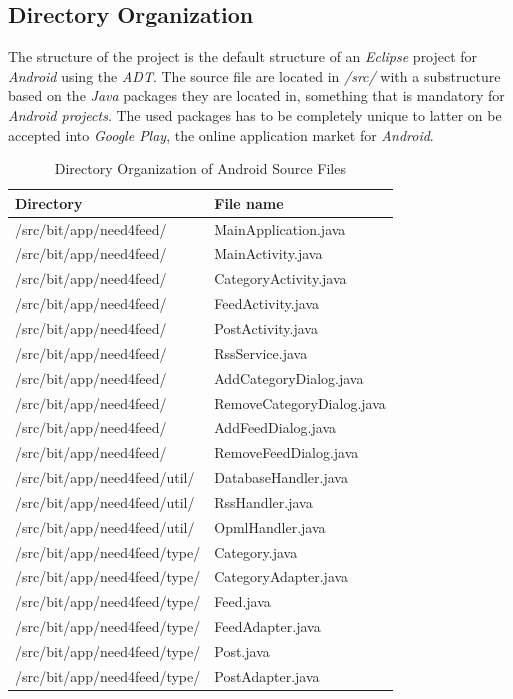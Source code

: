 \newpage
\subsection{Directory Organization}
\label{sec:directory_organization}
The structure of the project is the default structure of an \textit{Eclipse} project for \textit{Android} using the \textit{ADT}. The source file are located in \textit{/src/} with a substructure based on the \textit{Java} packages they are located in, something that is mandatory for \textit{Android projects}. The used packages has to be completely unique to latter on be accepted into \textit{Google Play}, the online application market for \textit{Android}. 
\begin{table}[hbt]
\begin{center}
    \begin{tabular}{ | l | l |}
    \hline
    \textbf{Directory} & \textbf{File name}\\ \hline
    /src/bit/app/need4feed/ & MainApplication.java\\ \hline
    /src/bit/app/need4feed/ & MainActivity.java\\ \hline
    /src/bit/app/need4feed/ & CategoryActivity.java\\ \hline
    /src/bit/app/need4feed/ & FeedActivity.java\\ \hline
    /src/bit/app/need4feed/ & PostActivity.java\\ \hline
    /src/bit/app/need4feed/ & RssService.java\\ \hline
    /src/bit/app/need4feed/ & AddCategoryDialog.java\\ \hline
    /src/bit/app/need4feed/ & RemoveCategoryDialog.java\\ \hline
    /src/bit/app/need4feed/ & AddFeedDialog.java\\ \hline
    /src/bit/app/need4feed/ & RemoveFeedDialog.java\\ \hline
    /src/bit/app/need4feed/util/ & DatabaseHandler.java\\ \hline
    /src/bit/app/need4feed/util/ & RssHandler.java\\ \hline
    /src/bit/app/need4feed/util/ & OpmlHandler.java\\ \hline
    /src/bit/app/need4feed/type/ & Category.java\\ \hline
    /src/bit/app/need4feed/type/ & CategoryAdapter.java\\ \hline
    /src/bit/app/need4feed/type/ & Feed.java\\ \hline
    /src/bit/app/need4feed/type/ & FeedAdapter.java\\ \hline
    /src/bit/app/need4feed/type/ & Post.java\\ \hline
    /src/bit/app/need4feed/type/ & PostAdapter.java\\ \hline
    \end{tabular}
    \caption{Directory Organization of Android Source Files}\label{tab:directory_organization_source}
\end{center}
\end{table}
